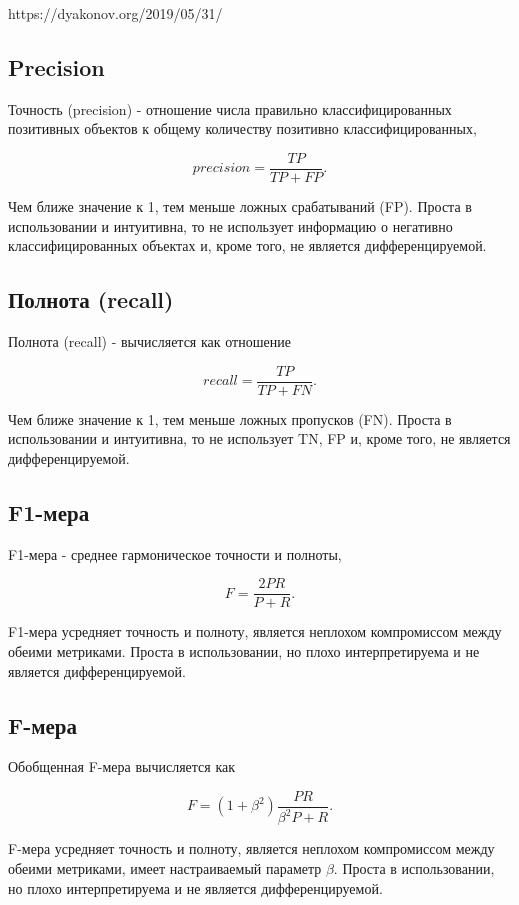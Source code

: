 https://dyakonov.org/2019/05/31/%

\subsection{Precision}

Точность (precision) - отношение числа правильно классифицированных позитивных объектов к общему количеству позитивно классифицированных,

$$
precision = \frac{TP}{TP + FP}.
$$

Чем ближе значение к 1, тем меньше ложных срабатываний (FP). Проста в использовании и интуитивна, то не использует информацию о негативно классифицированных объектах и, кроме того, не является дифференцируемой.

\subsection{Полнота (recall)}

Полнота (recall) - вычисляется как отношение

$$
recall = \frac{TP}{TP + FN}.
$$

Чем ближе значение к 1, тем меньше ложных пропусков (FN). Проста в использовании и интуитивна, то не использует TN, FP и, кроме того, не является дифференцируемой.

\subsection{F1-мера}

F1-мера - среднее гармоническое точности и полноты,

$$
F = \frac{2PR}{P + R}.
$$

F1-мера усредняет точность и полноту, является неплохом компромиссом между обеими метриками. Проста в использовании, но плохо интерпретируема и не является дифференцируемой.

\subsection{F-мера}

Обобщенная F-мера вычисляется как

$$
F = (1+\beta^2)\frac{PR}{\beta^2P + R}.
$$

F-мера усредняет точность и полноту, является неплохом компромиссом между обеими метриками, имеет настраиваемый параметр $\beta$. Проста в использовании, но плохо интерпретируема и не является дифференцируемой.

